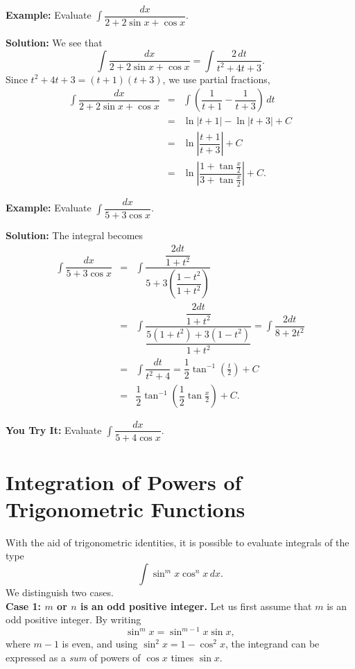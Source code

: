 \documentclass[titlepage,a4paper,12pt]{report}
\begin{document}
 \noindent \textbf{Example:} Evaluate $\displaystyle \int \dfrac{dx}{2+2\sin x+\cos x}$.
 
 \noindent \textbf{Solution:} We see that 
 \begin{equation*}
 \int \dfrac{dx}{2+2\sin x+\cos x} =\int \dfrac{2\, dt}{t^2+4t+3}.
\end{equation*}  
Since $t^2+4t+3=(t+1)(t+3)$, we use partial fractions, 
\begin{eqnarray*}
 \int \dfrac{dx}{2+2\sin x+\cos x} &=&\int \left(\dfrac{1}{t+1}-\dfrac{1}{t+3}\right)\, dt\\
 &=& \ln |t+1|-\ln |t+3|+C\\
 &=&\ln \left|\dfrac{t+1}{t+3}\right| +C\\
 &=&\ln \left|\dfrac{1+\tan \frac{x}{2}}{3+\tan \frac{x}{2}}\right| +C.
\end{eqnarray*}

\noindent \textbf{Example:} Evaluate $\displaystyle \int \dfrac{dx}{5+3\cos x}$.

\noindent \textbf{Solution:} The integral becomes 
\begin{eqnarray*}
\int \dfrac{dx}{5+3\cos x} &=& \int \dfrac{\dfrac{2dt}{1+t^2}}{5+3\left(\dfrac{1-t^2}{1+t^2}\right)}\\
&=& \int \dfrac{\dfrac{2dt}{1+t^2}}{\dfrac{5(1+t^2)+3(1-t^2)}{1+t^2}} = \int \dfrac{2dt}{8+2t^2}\\
&=& \int \dfrac{dt}{t^2+4} = \dfrac{1}{2}\tan ^{-1} \left(\frac{t}{2}\right) +C\\
&=& \dfrac{1}{2}\tan ^{-1} \left(\dfrac{1}{2}\tan \frac{x}{2}\right)+C.
\end{eqnarray*}

\noindent \textbf{You Try It:} Evaluate $\displaystyle \int \dfrac{dx}{5+4\cos x}$.

\section{Integration of Powers of Trigonometric Functions}
With the aid of trigonometric identities, it is possible to evaluate integrals of the type
\begin{equation*}
\int \sin ^m x \cos ^n x \, dx.
\end{equation*}
We distinguish two cases.\\

\noindent \textbf{Case 1: $m$ or $n$ is an odd positive integer.} Let us first assume that $m$ is an odd positive integer. By writing 
\begin{equation*}
\sin ^m x =\sin ^{m-1}x \sin x, 
\end{equation*} 
where $m-1$ is even, and using $\sin ^2 x =1-\cos ^2 x$, the integrand can be expressed as a \textit{sum} of powers of $\cos x$ times $\sin x$.
\end{document}
